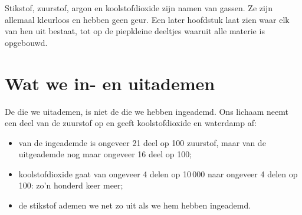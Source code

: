 \begin{remark}\label{rem:g4:air-a-mixture-of-gases:names}
Stikstof, zuurstof, argon en koolstofdioxide zijn namen van gassen. Ze
zijn allemaal kleurloos en hebben geen geur. Een later hoofdstuk laat
zien waar elk van hen uit bestaat, tot op de piepkleine deeltjes waaruit
alle materie is opgebouwd.
\end{remark}

\section{Wat we in- en uitademen}

\begin{proposition}\label{prop:g4:air-a-mixture-of-gases:breath}
De  die we uitademen, is niet de  die we hebben ingeademd. Ons
lichaam neemt een deel van de zuurstof op en geeft koolstofdioxide en
waterdamp af:
\begin{itemize}
  \item van de ingeademde  is ongeveer 21 deel op 100 zuurstof, maar
        van de uitgeademde  nog maar ongeveer 16 deel op 100;
  \item koolstofdioxide gaat van ongeveer 4 delen op 10\,000 naar ongeveer
        4 delen op 100: zo'n honderd keer meer;
  \item de stikstof ademen we net zo uit als we hem hebben ingeademd.
\end{itemize}
\end{proposition}


